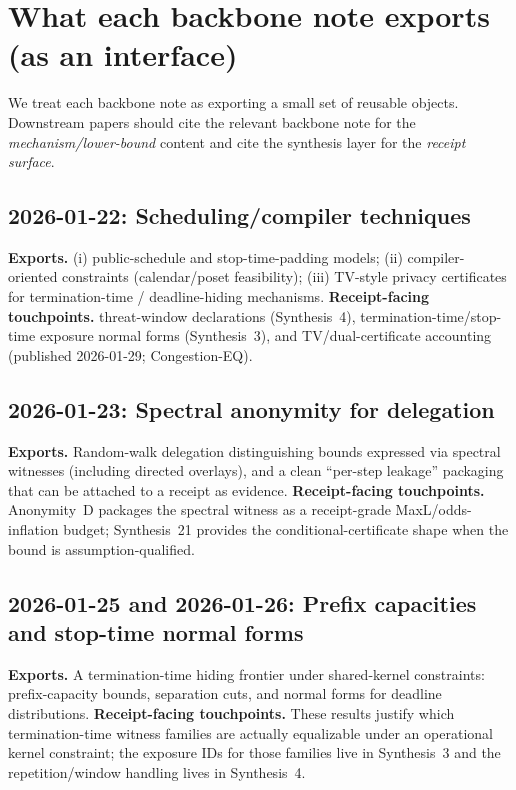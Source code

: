 \documentclass[11pt]{article}
\begin{document}
\section{What each backbone note exports (as an interface)}
We treat each backbone note as exporting a small set of reusable objects.
Downstream papers should cite the relevant backbone note for the 
\emph{mechanism/lower-bound} content and cite the synthesis layer for the \emph{receipt surface}.

\subsection{2026-01-22: Scheduling/compiler techniques}
\textbf{Exports.}
(i) public-schedule and stop-time-padding models; (ii) compiler-oriented constraints (calendar/poset feasibility); (iii) TV-style privacy certificates for termination-time / deadline-hiding mechanisms.
\textbf{Receipt-facing touchpoints.} threat-window declarations (Synthesis~4), termination-time/stop-time exposure normal forms (Synthesis~3), and TV/dual-certificate accounting (published 2026-01-29; Congestion-EQ).\cite{series:threatwindows,series:traceifaces,wiki:knapsack}

\subsection{2026-01-23: Spectral anonymity for delegation}
\textbf{Exports.}
Random-walk delegation distinguishing bounds expressed via spectral witnesses (including directed overlays), and a clean ``per-step leakage'' packaging that can be attached to a receipt as evidence.
\textbf{Receipt-facing touchpoints.} Anonymity~D packages the spectral witness as a receipt-grade MaxL/odds-inflation budget; Synthesis~21 provides the conditional-certificate shape when the bound is assumption-qualified.\cite{series:spectral2budget,series:condcert}

\subsection{2026-01-25 and 2026-01-26: Prefix capacities and stop-time normal forms}
\textbf{Exports.}
A termination-time hiding frontier under shared-kernel constraints: prefix-capacity bounds, separation cuts, and normal forms for deadline distributions.
\textbf{Receipt-facing touchpoints.} These results justify which termination-time witness families are actually equalizable under an operational kernel constraint; the exposure IDs for those families live in Synthesis~3 and the repetition/window handling lives in Synthesis~4.\cite{series:traceifaces,series:threatwindows}
\end{document}
